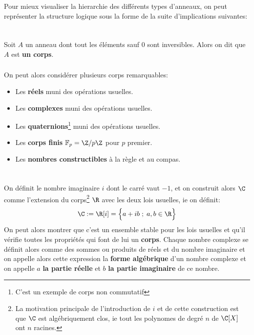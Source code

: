 \subsection*{}
Pour mieux visualiser la hierarchie des différents types d'anneaux, on peut représenter la structure logique sous la forme de la suite d'implications suivantes:
\begin{center}
\end{center}
\chapter*{}
Soit \(A\) un anneau dont tout les éléments sauf \(0\) sont inversibles. Alors on dit que \(A\) est \textbf{un corps}.

\subsection*{}
On peut alors considérer plusieurs corps remarquables:
\begin{itemize}
   \item Les \textbf{réels} muni des opérations usuelles.
   \item Les \textbf{complexes} muni des opérations usuelles.
   \item Les \textbf{quaternions}\footnote[1]{C'est un exemple de corps non commutatif} muni des opérations usuelles.
   \item Les \textbf{corps finis} \(\mathbb{F}_p = \Z/p\Z\) pour \(p\) premier.
   \item Les \textbf{nombres constructibles} à la règle et au compas.
\end{itemize}
\chapter*{} %

On définit le nombre imaginaire \(i\) dont le carré vaut \(-1\), et on construit alors \(\C\) comme l'extension du corps\footnote[1]{La motivation principale de l'introduction de \(i\) et de cette construction est que \(\C\) est algébriquement clos, ie tout les polynomes de degré \(n\) de \(\C[X]\) ont \(n\) racines.} \(\R\) avec les deux lois usuelles, ie on définit:
\[
   \C := \R[i] = \Bigl\{a + ib \; ; \; a, b \in \R \Bigl\}
\]
On peut alors montrer que c'est un ensemble stable pour les lois usuelles et qu'il vérifie toutes les propriétés qui font de lui un \textbf{corps}.\+
Chaque nombre complexe se définit alors comme des sommes ou produits de réels et du nombre imaginaire et on appelle alors cette expression la \textbf{forme algébrique} d'un nombre complexe et on appelle \(a\) \textbf{la partie réelle} et \(b\) \textbf{la partie imaginaire} de ce nombre. \<

